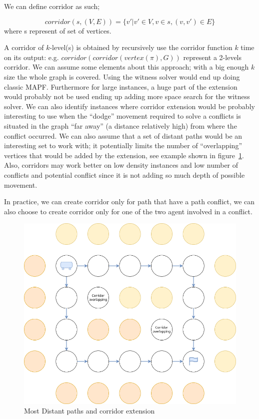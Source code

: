 We can define corridor as such;

\[
 corridor(s,(V,E)) = \{v' | v' \in V, v\in s, (v,v') \in E \}
\] where s represent of set of vertices.

A corridor of \(k\)-level(s) is obtained by recursively use the corridor function \(k\) time on its output: e.g. \(corridor(corridor(vertex(\pi),G))\) represent a 2-levels corridor.
We can assume some elements about this approach; with a big enough \(k\) size the whole graph is covered. Using the witness solver would end up doing classic MAPF. Furthermore for large instances, a huge part of the extension would probably not be used ending up adding more space search for the witness solver. We can also identify instances where corridor extension would be probably interesting to use when the ``dodge'' movement required to solve a conflicts is situated in the graph ``far away'' (a distance relatively high) from where the conflict occurred. We can also assume that a set of distant paths would be an interesting set to work with; it potentially limits the number of ``overlapping'' vertices that would be added by the extension, see example shown in figure~\ref{img:case_corridor}. Also, corridors may work better on low density instances and low number of conflicts and potential conflict since it is not adding so much depth of possible movement.

In practice, we can create corridor only for path that have a path conflict, we can also choose to create corridor only for one of the two agent involved in a conflict.


\begin{figure}[H]
  \centering
  \caption{Most Distant paths and corridor extension}\label{img:case_corridor}
  \includegraphics[width=\widthimg]{img/case_corridor.drawio.png}
\end{figure}


